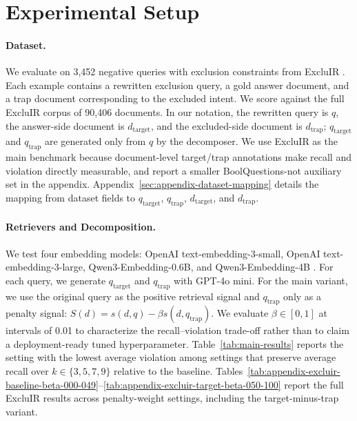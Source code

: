 \documentclass[11pt]{article}
\begin{document}
\section{Experimental Setup}

\paragraph{Dataset.}
We evaluate on 3,452 negative queries with exclusion constraints from ExcluIR \citep{zhang2024excluir}.
Each example contains a rewritten exclusion query, a gold answer document, and a trap document corresponding to the excluded intent.
We score against the full ExcluIR corpus of 90,406 documents.
In our notation, the rewritten query is $q$, the answer-side document is $d_{\mathrm{target}}$, and the excluded-side document is $d_{\mathrm{trap}}$; $q_{\mathrm{target}}$ and $q_{\mathrm{trap}}$ are generated only from $q$ by the decomposer.
We use ExcluIR as the main benchmark because document-level target/trap annotations make recall and violation directly measurable, and report a smaller BoolQuestions-not auxiliary set in the appendix.
Appendix~\ref{sec:appendix-dataset-mapping} details the mapping from dataset fields to $q_{\mathrm{target}}$, $q_{\mathrm{trap}}$, $d_{\mathrm{target}}$, and $d_{\mathrm{trap}}$.

\paragraph{Retrievers and Decomposition.}
We test four embedding models: OpenAI text-embedding-3-small, OpenAI text-embedding-3-large, Qwen3-Embedding-0.6B, and Qwen3-Embedding-4B \citep{zhang2025qwen3embeddingadvancingtext}.
For each query, we generate $q_{\mathrm{target}}$ and $q_{\mathrm{trap}}$ with GPT-4o mini.
For the main variant, we use the original query as the positive retrieval signal and $q_{\mathrm{trap}}$ only as a penalty signal: $S(d)=s(d,q)-\beta s(d,q_{\mathrm{trap}})$.
We evaluate $\beta \in [0,1]$ at intervals of 0.01 to characterize the recall--violation trade-off rather than to claim a deployment-ready tuned hyperparameter.
Table~\ref{tab:main-results} reports the setting with the lowest average violation among settings that preserve average recall over $k \in \{3,5,7,9\}$ relative to the baseline.
Tables~\ref{tab:appendix-excluir-baseline-beta-000-049}--\ref{tab:appendix-excluir-target-beta-050-100} report the full ExcluIR results across penalty-weight settings, including the target-minus-trap variant.
\end{document}
